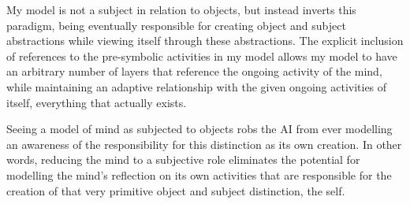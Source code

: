 My model is not a subject in relation to objects, but instead inverts
this paradigm, being eventually responsible for creating object and
subject abstractions while viewing itself through these abstractions.
The explicit inclusion of references to the pre-symbolic activities in
my model allows my model to have an arbitrary number of layers that
reference the ongoing activity of the mind, while maintaining an
adaptive relationship with the given ongoing activities of itself,
everything that actually exists.

Seeing a model of mind as subjected to objects robs the AI from ever
modelling an awareness of the responsibility for this distinction as
its own creation.  In other words, reducing the mind to a subjective
role eliminates the potential for modelling the mind's reflection on
its own activities that are responsible for the creation of that very
primitive object and subject distinction, the self.

